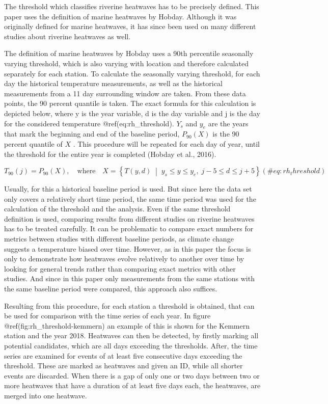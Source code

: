 \documentclass[
]{article}
\begin{document}
The threshold which classifies riverine heatwaves has to be precisely
defined. This paper uses the definition of marine heatwaves by Hobday.
Although it was originally defined for marine heatwaves, it has since
been used on many different studies about riverine heatwaves as well.

The definition of marine heatwaves by Hobday uses a 90th percentile
seasonally varying threshold, which is also varying with location and
therefore calculated separately for each station. To calculate the
seasonally varying threshold, for each day the historical temperature
measurements, as well as the historical measurements from a 11 day
surrounding window are taken. From these data points, the 90 percent
quantile is taken. The exact formula for this calculation is depicted
below, where y is the year variable, d is the day variable and j is the
day for the considered temperature @ref(eq:rh\_threshold). \(Y_s\) and
\(y_e\) are the years that mark the beginning and end of the baseline
period, \(P_{90}(X)\) is the 90 percent quantile of \(X\) . This
procedure will be repeated for each day of year, until the threshold for
the entire year is completed (Hobday et al., 2016).

\begin{equation}
T_{90}(j) = P_{90}(X),
\quad \text{where}
\quad
X = \left\{T(y,d)\;\middle|\; y_s \le y \le y_e,\; j-5 \le d \le j+5 \right\}
(\#eq:rh_threshold)
\end{equation}

Usually, for this a historical baseline period is used. But since here
the data set only covers a relatively short time period, the same time
period was used for the calculation of the threshold and the analysis.
Even if the same threshold definition is used, comparing results from
different studies on riverine heatwaves has to be treated carefully. It
can be problematic to compare exact numbers for metrics between studies
with different baseline periods, as climate change suggests a
temperature biased over time. However, as in this paper the focus is
only to demonstrate how heatwaves evolve relatively to another over time
by looking for general trends rather than comparing exact metrics with
other studies. And since in this paper only measurements from the same
stations with the same baseline period were compared, this approach also
suffices.

Resulting from this procedure, for each station a threshold is obtained,
that can be used for comparison with the time series of each year. In
figure @ref(fig:rh\_threshold-kemmern) an example of this is shown for
the Kemmern station and the year 2018. Heatwaves can then be detected,
by firstly marking all potential candidates, which are all days
exceeding the thresholds. After, the time series are examined for events
of at least five consecutive days exceeding the threshold. These are
marked as heatwaves and given an ID, while all shorter events are
discarded. When there is a gap of only one or two days between two or
more heatwaves that have a duration of at least five days each, the
heatwaves, are merged into one heatwave.
\end{document}
